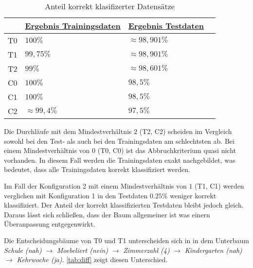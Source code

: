\useunder{\uline}{\ul}{}
\begin{table}[h]
    \begin{center}
        \begin{tabular}{|l|l|l|l|}
        \hline
                                & {\ul \textbf{Ergebnis Trainingsdaten}} & {\ul \textbf{Ergebnis Testdaten}} \\
            \hline
            T0                  & $100\%$                                & $\approx 98,901\%$                  \\
            \hline
            T1                  & $99,75\%$                              & $\approx 98,901\%$                  \\
            \hline
            T2                  & $99\%$                                 & $\approx 98,601\%$                  \\
            \hline
            \hline
            C0                  & $100\%$                                & $98,5\%$                  \\
            \hline
            C1                  & $100\%$                                & $98,5\%$                  \\
            \hline
            C2                  & $\approx 99,4\%$                       & $97,5\%$                  \\
            \hline
        \end{tabular}
        \caption{Anteil korrekt klasifizerter Datensätze}
        \label{tab:run-results}
    \end{center}
\end{table}

Die Durchläufe mit dem Mindestverhältnis $2$ (T2, C2) scheiden im Vergleich sowohl bei den Test- als auch bei den Trainingsdaten am schlechtsten ab.
Bei einem Mindestverhältnis von $0$ (T0, C0) ist das Abbruchkriterium quasi nicht vorhanden.
In diesem Fall werden die Trainingsdaten exakt nachgebildet,
was bedeutet, dass alle Trainingsdaten korrekt klassifiziert werden.

Im Fall der Konfiguration 2 mit einem Mindestverhältnis von $1$ (T1, C1) werden verglichen mit Konfiguration 1 in den Testdaten $0.25\%$ weniger korrekt klassifiziert.
Der Anteil der korrekt klassifizierten Testdaten bleibt jedoch gleich.
Daraus lässt sich schließen,
dass der Baum allgemeiner ist was einern Überanpassung entgegenwirkt.

Die Entscheidungsbäume von T0 und T1 unterscheiden sich in in dem Unterbaum
\emph{Schule (nah)} $\rightarrow$ \emph{Moebeliert (nein)} $\rightarrow$ \emph{Zimmerzahl (4)} $\rightarrow$ \emph{Kindergarten (nah)} $\rightarrow$ \emph{Kehrwoche (ja)}.
\autoref{tab:diff} zeigt diesen Unterschied.

